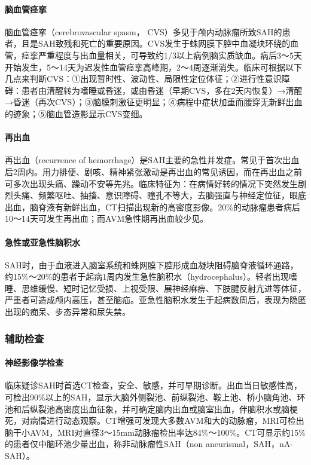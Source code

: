\paragraph{脑血管痉挛}

脑血管痉挛（cerebrovascular spasm，
CVS）多见于颅内动脉瘤所致SAH的患者，且是SAH致残和死亡的重要原因。CVS发生于蛛网膜下腔中血凝块环绕的血管，痉挛严重程度与出血量相关，可导致约1/3以上病例脑实质缺血。病后3～5天开始发生，5～14天为迟发性血管痉挛高峰期，2～4周逐渐消失。临床可根据以下几点来判断CVS：①出现暂时性、波动性、局限性定位体征；②进行性意识障碍：患者由清醒转为嗜睡或昏迷，或由昏迷（早期CVS，多在2天内恢复）→清醒→昏迷（再次CVS）；③脑膜刺激征更明显；④病程中症状加重而腰穿无新鲜出血的迹象；⑤脑血管造影显示CVS变细。

\paragraph{再出血}

再出血（recurrence of
hemorrhage）是SAH主要的急性并发症。常见于首次出血后2周内。用力排便、剧咳、精神紧张激动是再出血的常见诱因，而在再出血之前可多次出现头痛、躁动不安等先兆。临床特征为：在病情好转的情况下突然发生剧烈头痛、频繁呕吐、抽搐、意识障碍、瞳孔不等大，去脑强直与神经定位征，眼底出血，脑脊液有新鲜出血，CT扫描出现新的高密度影像。20\%的动脉瘤患者病后10～14天可发生再出血；而AVM急性期再出血较少见。

\paragraph{急性或亚急性脑积水}

SAH时，由于血液进入脑室系统和蛛网膜下腔形成血凝块阻碍脑脊液循环通路，约15\%～20\%的患者于起病1周内发生急性脑积水（hydrocephalus）。轻者出现嗜睡、思维缓慢、短时记忆受损、上视受限、展神经麻痹、下肢腱反射亢进等体征，严重者可造成颅内高压，甚至脑疝。亚急性脑积水发生于起病数周后，表现为隐匿出现的痴呆、步态异常和尿失禁。

\subsubsection{辅助检查}

\paragraph{神经影像学检查}

临床疑诊SAH时首选CT检查，安全、敏感，并可早期诊断。出血当日敏感性高，可检出90\%以上的SAH，显示大脑外侧裂池、前纵裂池、鞍上池、桥小脑角池、环池和后纵裂池高密度出血征象，并可确定脑内出血或脑室出血，伴脑积水或脑梗死，对病情进行动态观察。CT增强可发现大多数AVM和大的动脉瘤，MRI可检出脑干小AVM，MRI对直径3～15mm动脉瘤检出率达84\%～100\%。CT可显示约15\%的患者仅中脑环池少量出血，称非动脉瘤性SAH（non
aneurismal，SAH，nA-SAH）。

